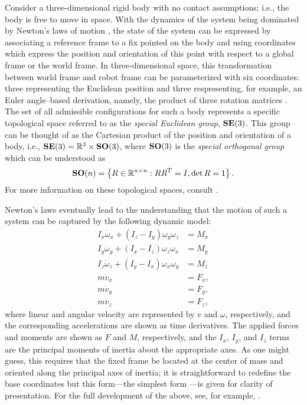 Consider a three-dimensional rigid body with no contact assumptions; i.e., the
body is free to move in space.
%
With the dynamics of the system being dominated by Newton's laws of motion
\cite{Feynman1964}, the state of the system can be expressed by associating a
reference frame to a fix pointed on the body and using coordinates which express
the position and orientation of this point with respect to a global frame or the
world frame.
%
In three-dimensional space, this transformation between world frame and robot
frame can be parameterized with six coordinates: three representing the
Euclidean position and three respresenting, for example, an Euler angle--based
derivation, namely, the product of three rotation matrices
\cite[Ch. 7]{Baruh1998}.
%
The set of all admissible configurations for such a body represents a specific
topological space referred to as the {\em special Euclidean group}, $\mathbf{SE}(3)$.
%
This group can be thought of as the Cartesian product of the position and
orientation of a body, i.e., $\mathbf{SE}(3) = \mathbb{R}^3 \times \mathbf{SO}(3)$, where $\mathbf{SO}(3)$ is
the {\em special orthogonal group} which can be understood as
\begin{align*}
  \mathbf{SO}(n) = \left\{ R \in \mathbb{R}^{n \times n} : R R^T = I, \det R = 1 \right\}.
\end{align*}
For more information on these topological spaces, consult
\cite[Ch. 2]{Murray1994}.


Newton's laws eventually lead to the understanding that the motion of such a
system can be captured by the following dynamic model:
\begin{align*}
  I_{x} \dot{\omega}_{x} + (I_{z} - I_{y}) \omega_{y} \omega_{z} &= M_{x}\\
  I_{y} \dot{\omega}_{y} + (I_{x} - I_{z}) \omega_{z} \omega_{x} &= M_{y}\\
  I_{z} \dot{\omega}_{z} + (I_{y} - I_{x}) \omega_{x} \omega_{y} &= M_{z}\\
  m \dot{v}_{x} &= F_{x},\\
  m \dot{v}_{y} &= F_{y},\\
  m \dot{v}_{z} &= F_{z},
\end{align*}
where linear and angular velocity are represented by $v$ and $\omega$,
respectively, and the corresponding accelerations are shown as time
derivatives.
%
The applied forces and moments are shown as $F$ and $M$, respectively, and the
$I_{x}$, $I_{y}$, and $I_{z}$ terms are the principal moments of inertia about
the appropriate axes.
%
As one might guess, this requires that the fixed frame be located at the center
of mass and oriented along the principal axes of inertia; it is straightforward
to redefine the base coordinates but this form---the simplest form ---is given
for clarity of presentation.
%
For the full development of the above, see, for example, \cite[Ch. 8]{Baruh1998}.

